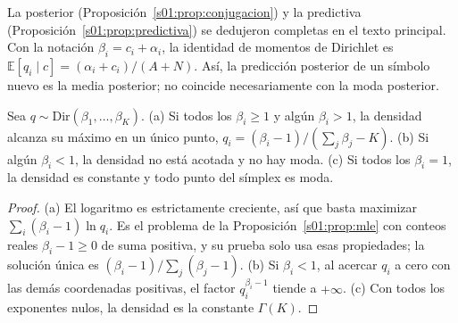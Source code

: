 La posterior (Proposición~\ref{s01:prop:conjugacion}) y la predictiva
(Proposición~\ref{s01:prop:predictiva}) se dedujeron completas en el texto
principal. Con la notación $\beta_i=c_i+\alpha_i$, la identidad de momentos de
Dirichlet es $\mathbb E[q_i\mid c]=(\alpha_i+c_i)/(A+N)$.
Así, la predicción posterior de un símbolo nuevo es la media posterior;
no coincide necesariamente con la moda posterior.
\begin{proposicion}\label{s01:prop:moda}
Sea $q\sim\mathrm{Dir}(\beta_1,\ldots,\beta_K)$. (a) Si todos los $\beta_i\ge1$ y
algún $\beta_i>1$, la densidad alcanza su máximo en un único punto,
$q_i=(\beta_i-1)/(\sum_j\beta_j-K)$. (b) Si algún $\beta_i<1$, la densidad no está
acotada y no hay moda. (c) Si todos los $\beta_i=1$, la densidad es constante y
todo punto del símplex es moda.
\end{proposicion}
\begin{proof}
(a) El logaritmo es estrictamente creciente, así que basta maximizar
$\sum_i(\beta_i-1)\ln q_i$. Es el problema de la Proposición~\ref{s01:prop:mle}
con conteos reales $\beta_i-1\ge0$ de suma positiva, y su prueba solo usa esas
propiedades; la solución única es $(\beta_i-1)/\sum_j(\beta_j-1)$.
(b) Si $\beta_i<1$, al acercar $q_i$ a cero con las demás coordenadas positivas,
el factor $q_i^{\beta_i-1}$ tiende a $+\infty$.
(c) Con todos los exponentes nulos, la densidad es la constante $\Gamma(K)$.
\end{proof}

